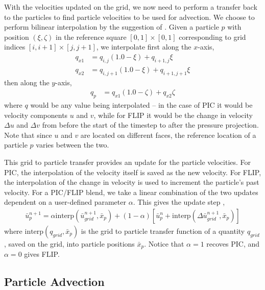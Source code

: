 \documentclass[sigconf]{acmart}
\begin{document}
With the velocities updated on the grid, we now need to perform a transfer back to the particles to find particle velocities to be used for advection. We choose to perform bilinear interpolation by the suggestion of \cite{zhu2005}. Given a particle $p$ with position $(\xi,\zeta)$ in the reference square $[0,1]\times[0,1]$ corresponding to grid indices $[i,i+1]\times[j,j+1]$, we interpolate first along the $x$-axis,
\begin{align}
  q_{x1} &= q_{i,j}(1.0-\xi) + q_{i+1,j}\xi \\
  q_{x2} &= q_{i,j+1}(1.0-\xi) + q_{i+1,j+1}\xi
\end{align}
then along the $y$-axis,
\begin{align}
  q_{p} &= q_{x1}(1.0-\zeta) + q_{x2}\zeta
\end{align}
where $q$ would be any value being interpolated -- in the case of PIC it would be velocity components $u$ and $v$, while for FLIP it would be the change in velocity $\Delta{}u$ and $\Delta{}v$ from before the start of the timestep to after the pressure projection. Note that since $u$ and $v$ are located on different faces, the reference location of a particle $p$ varies between the two.

This grid to particle transfer provides an update for the particle velocities. For PIC, the interpolation of the velocity itself is saved as the new velocity. For FLIP, the interpolation of the change in velocity is used to increment the particle's past velocity. For a PIC/FLIP blend, we take a linear combination of the two updates dependent on a user-defined parameter $\alpha$. This gives the update step \cite{bridson2015},
\begin{align}
  \bar{u}^{n+1}_p = \alpha{}\text{interp}(\bar{u}^{n+1}_{grid},\bar{x}_p) + (1-\alpha)[\bar{u}^{n}_{p}+\text{interp}(\Delta{}\bar{u}_{grid}^{n+1},\bar{x}_p)]
\end{align}
where $\text{interp}(q_{grid},\bar{x}_p)$ is the grid to particle transfer function of a quantity $q_{grid}$, saved on the grid, into particle positions $\bar{x}_p$. Notice that $\alpha=1$ recoves PIC, and $\alpha=0$ gives FLIP.

\subsection{Particle Advection}
\end{document}
